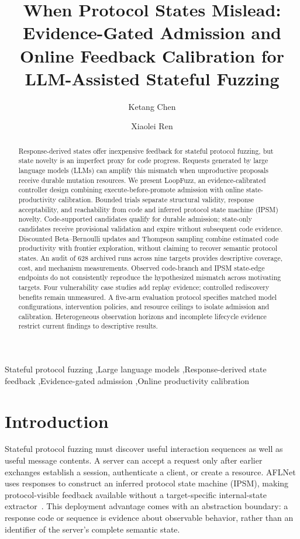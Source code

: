\documentclass[final,5p,times,number]{elsarticle}
\begin{document}
\raggedbottom
\begin{frontmatter}
\title{When Protocol States Mislead: Evidence-Gated Admission and Online Feedback Calibration for LLM-Assisted Stateful Fuzzing}
\author[inst1]{Ketang Chen}
\author[inst1]{Xiaolei Ren}
\begin{abstract}
Response-derived states offer inexpensive feedback for stateful protocol fuzzing, but state novelty is an imperfect proxy for code progress. Requests generated by large language models (LLMs) can amplify this mismatch when unproductive proposals receive durable mutation resources. We present LoopFuzz, an evidence-calibrated controller design combining execute-before-promote admission with online state-productivity calibration. Bounded trials separate structural validity, response acceptability, and reachability from code and inferred protocol state machine (IPSM) novelty. Code-supported candidates qualify for durable admission; state-only candidates receive provisional validation and expire without subsequent code evidence. Discounted Beta--Bernoulli updates and Thompson sampling combine estimated code productivity with frontier exploration, without claiming to recover semantic protocol states. An audit of 628 archived runs across nine targets provides descriptive coverage, cost, and mechanism measurements. Observed code-branch and IPSM state-edge endpoints do not consistently reproduce the hypothesized mismatch across motivating targets. Four vulnerability case studies add replay evidence; controlled rediscovery benefits remain unmeasured. A five-arm evaluation protocol specifies matched model configurations, intervention policies, and resource ceilings to isolate admission and calibration. Heterogeneous observation horizons and incomplete lifecycle evidence restrict current findings to descriptive results.
\end{abstract}
\begin{keyword}
Stateful protocol fuzzing \sep Large language models \sep Response-derived state feedback \sep Evidence-gated admission \sep Online productivity calibration
\end{keyword}
\end{frontmatter}

\section{Introduction}
Stateful protocol fuzzing must discover useful interaction sequences as well as useful message contents. A server can accept a request only after earlier exchanges establish a session, authenticate a client, or create a resource. AFLNet uses responses to construct an inferred protocol state machine (IPSM), making protocol-visible feedback available without a target-specific internal-state extractor~\cite{aflnet}. This deployment advantage comes with an abstraction boundary: a response code or sequence is evidence about observable behavior, rather than an identifier of the server's complete semantic state.
\end{document}
